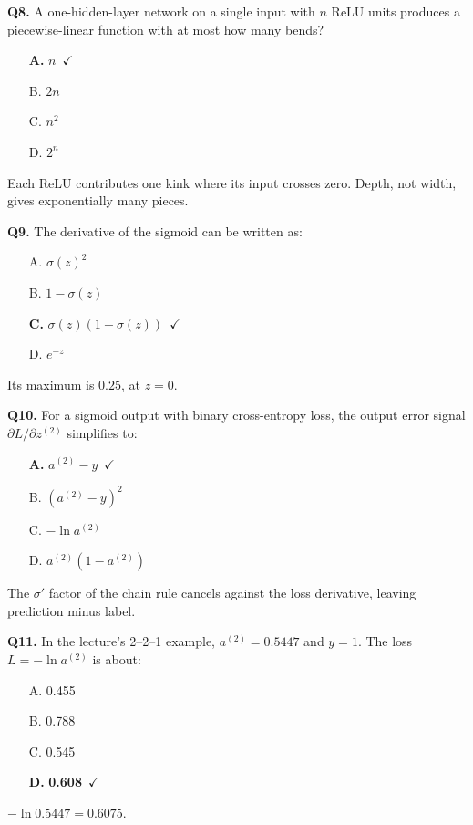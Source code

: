 \documentclass[11pt]{article}
\begin{document}
{\noindent\textbf{Q8.} A one-hidden-layer network on a single input with $n$ ReLU units produces a piecewise-linear function with at most how many bends?\begin{itemize}[leftmargin=2.2em,itemsep=0pt,topsep=1pt]\item[\textbf{A.}] \textbf{$n$}~{\color{GrnN}$\checkmark$}\item[B.] $2n$\item[C.] $n^2$\item[D.] $2^n$\end{itemize} Each ReLU contributes one kink where its input crosses zero. Depth, not width, gives exponentially many pieces.\par\medskip

\noindent\textbf{Q9.} The derivative of the sigmoid can be written as:\begin{itemize}[leftmargin=2.2em,itemsep=0pt,topsep=1pt]\item[A.] $\sigma(z)^2$\item[B.] $1-\sigma(z)$\item[\textbf{C.}] \textbf{$\sigma(z)(1-\sigma(z))$}~{\color{GrnN}$\checkmark$}\item[D.] $e^{-z}$\end{itemize} Its maximum is $0.25$, at $z=0$.\par\medskip

\noindent\textbf{Q10.} For a sigmoid output with binary cross-entropy loss, the output error signal $\partial L/\partial z^{(2)}$ simplifies to:\begin{itemize}[leftmargin=2.2em,itemsep=0pt,topsep=1pt]\item[\textbf{A.}] \textbf{$a^{(2)}-y$}~{\color{GrnN}$\checkmark$}\item[B.] $(a^{(2)}-y)^2$\item[C.] $-\ln a^{(2)}$\item[D.] $a^{(2)}(1-a^{(2)})$\end{itemize} The $\sigma'$ factor of the chain rule cancels against the loss derivative, leaving prediction minus label.\par\medskip

\noindent\textbf{Q11.} In the lecture's 2--2--1 example, $a^{(2)}=0.5447$ and $y=1$. The loss $L=-\ln a^{(2)}$ is about:\begin{itemize}[leftmargin=2.2em,itemsep=0pt,topsep=1pt]\item[A.] 0.455\item[B.] 0.788\item[C.] 0.545\item[\textbf{D.}] \textbf{0.608}~{\color{GrnN}$\checkmark$}\end{itemize} $-\ln0.5447=0.6075$.\par\medskip

}
\end{document}
